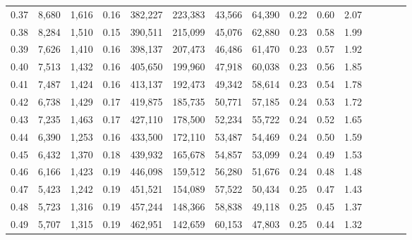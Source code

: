 \begin{tabular}{rrrcrrrrrrrrrrr}
0.37 &   8,680 &  1,616 &                                       0.16 &  382,227 &  223,383 &   43,566 &   64,390 &  0.22 &  0.60 &                         2.07 \\
0.38 &   8,284 &  1,510 &                                       0.15 &  390,511 &  215,099 &   45,076 &   62,880 &  0.23 &  0.58 &                         1.99 \\
0.39 &   7,626 &  1,410 &                                       0.16 &  398,137 &  207,473 &   46,486 &   61,470 &  0.23 &  0.57 &                         1.92 \\
0.40 &   7,513 &  1,432 &                                       0.16 &  405,650 &  199,960 &   47,918 &   60,038 &  0.23 &  0.56 &                         1.85 \\
0.41 &   7,487 &  1,424 &                                       0.16 &  413,137 &  192,473 &   49,342 &   58,614 &  0.23 &  0.54 &                         1.78 \\
0.42 &   6,738 &  1,429 &                                       0.17 &  419,875 &  185,735 &   50,771 &   57,185 &  0.24 &  0.53 &                         1.72 \\
0.43 &   7,235 &  1,463 &                                       0.17 &  427,110 &  178,500 &   52,234 &   55,722 &  0.24 &  0.52 &                         1.65 \\
0.44 &   6,390 &  1,253 &                                       0.16 &  433,500 &  172,110 &   53,487 &   54,469 &  0.24 &  0.50 &                         1.59 \\
0.45 &   6,432 &  1,370 &                                       0.18 &  439,932 &  165,678 &   54,857 &   53,099 &  0.24 &  0.49 &                         1.53 \\
0.46 &   6,166 &  1,423 &                                       0.19 &  446,098 &  159,512 &   56,280 &   51,676 &  0.24 &  0.48 &                         1.48 \\
0.47 &   5,423 &  1,242 &                                       0.19 &  451,521 &  154,089 &   57,522 &   50,434 &  0.25 &  0.47 &                         1.43 \\
0.48 &   5,723 &  1,316 &                                       0.19 &  457,244 &  148,366 &   58,838 &   49,118 &  0.25 &  0.45 &                         1.37 \\
0.49 &   5,707 &  1,315 &                                       0.19 &  462,951 &  142,659 &   60,153 &   47,803 &  0.25 &  0.44 &                         1.32 \\

\end{tabular}

